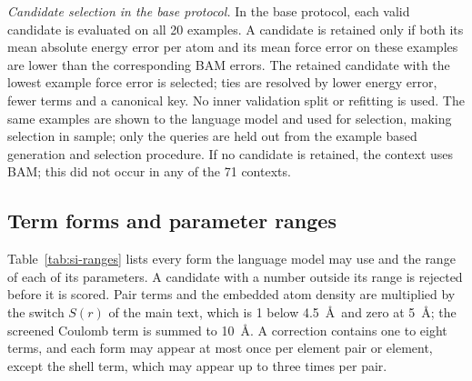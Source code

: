\textit{Candidate selection in the base protocol.} In the base protocol, each valid candidate is evaluated on all 20 examples. A candidate is retained only if both its mean absolute energy error per atom and its mean force error on these examples are lower than the corresponding BAM errors. The retained candidate with the lowest example force error is selected; ties are resolved by lower energy error, fewer terms and a canonical key. No inner validation split or refitting is used. The same examples are shown to the language model and used for selection, making selection in sample; only the queries are held out from the example based generation and selection procedure. If no candidate is retained, the context uses BAM\ifbulk; this did not occur in any of the 71 contexts\fi.

\subsection{Term forms and parameter ranges}

Table~\ref{tab:si-ranges} lists every form the language model may use and the range of each of its parameters. A candidate with a number outside its range is rejected before it is scored. Pair terms and the embedded atom density are multiplied by the switch $S(r)$ of the main text, which is 1 below 4.5~\AA\ and zero at 5~\AA; the screened Coulomb term is summed to 10~\AA. A correction contains one to eight terms, and each form may appear at most once per element pair or element, except the shell term, which may appear up to three times per pair.

